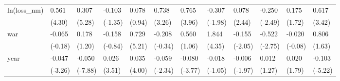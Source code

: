 \begin{tabular}{p{1.5cm} p{2cm} p{1.7cm} p{1.7cm} p{1.7cm} p{1.7cm} p{1.7cm} p{1.7cm} p{1.7cm} p{1.7cm} p{1.7cm} p{1.7cm}}
\hline
ln(loss\_nm)     &    0.561\sym{**} &    0.307\sym{***}&   -0.103         &    0.078         &    0.738\sym{**} &    0.765\sym{**} &   -0.307         &    0.078\sym{*}  &   -0.250\sym{*}  &    0.175         &    0.617\sym{**} \\
                &   (4.30)         &   (5.28)         &  (-1.35)         &   (0.94)         &   (3.26)         &   (3.96)         &  (-1.98)         &   (2.44)         &  (-2.49)         &   (1.72)         &   (3.42)         \\
war             &   -0.065         &    0.178         &   -0.158         &    0.729\sym{***}&   -0.208         &    0.560         &    1.844\sym{**} &   -0.155\sym{*}  &   -0.522\sym{*}  &   -0.020         &    0.806         \\
                &  (-0.18)         &   (1.20)         &  (-0.84)         &   (5.21)         &  (-0.34)         &   (1.06)         &   (4.35)         &  (-2.05)         &  (-2.75)         &  (-0.08)         &   (1.63)         \\
year            &   -0.047\sym{**} &   -0.050\sym{***}&    0.026\sym{**} &    0.035\sym{**} &   -0.059\sym{*}  &   -0.080\sym{**} &   -0.018         &   -0.006         &    0.012         &    0.020         &   -0.103\sym{***}\\
                &  (-3.26)         &  (-7.88)         &   (3.51)         &   (4.00)         &  (-2.34)         &  (-3.77)         &  (-1.05)         &  (-1.97)         &   (1.27)         &   (1.79)         &  (-5.22)         \\
\end{tabular}
